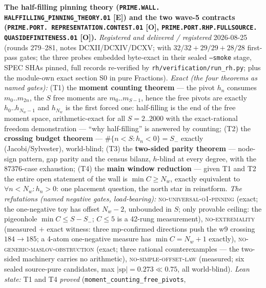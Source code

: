 \par\smallskip\noindent\textbf{The half-filling pinning theory
(\texttt{PRIME.WALL.\allowbreak
HALFFILLING\_PINNING\_THEORY.01} [E]) and the two wave-5
contracts (\texttt{PRIME.PORT.\allowbreak
REPRESENTATION.\allowbreak CONTEST.01} [O],
\texttt{PRIME.PORT.RHP.\allowbreak FULLSOURCE.\allowbreak
QUASIDEFINITENESS.01} [O]).}
{\sloppy
\emph{Registered and delivered / registered} 2026-08-25 (rounds
279--281, notes DCXII/DCXIV/DCXV;
 with $32/32 + 29/29
+ 28/28$ first-pass gates; the three probes embedded byte-exact
in their sealed \texttt{--smoke} stage, SPEC SHAs pinned, full
records re-verified by \texttt{rh/verification/run\_rh.py}; plus
the module-own exact section S0 in pure Fractions).  \emph{Exact
(the four theorems as named gates):} (T1) the \textbf{moment
counting theorem} --- the pivot $h_n$ consumes $m_0..m_{2n}$, the
$S$ free moments are $m_0..m_{S-1}$, hence the free pivots are
exactly $h_0..h_{N_w-1}$ and $h_{N_w}$ is the first forced one:
half-filling is the end of the free moment space, arithmetic-exact
for all $S = 2..2000$ with the exact-rational freedom
demonstration --- ``why half-filling'' is answered by counting;
(T2) the \textbf{crossing budget theorem} --- $\#\{n < S : h_n <
0\} = S_-$ exactly (Jacobi/Sylvester), world-blind; (T3) the
\textbf{two-sided parity theorem} --- node-sign pattern, gap
parity and the census bilanz, $h$-blind at every degree, with the
$87376$-case exhaustion; (T4) the \textbf{main window reduction}
--- given T1 and T2 the entire open statement of the wall is
$\min C \ge N_w$, exactly equivalent to $\forall n < N_w : h_n >
0$: one placement question, the north star in reinstform.
\emph{The refutations (named negative gates, load-bearing):}
\textsc{no-universal-o1-pinning} (exact; the one-negative toy has
offset $N_w - 2$, unbounded in $S$; only provable ceiling: the
pigeonhole $\min C \le S - S_-$; $C \le 5$ is a 42-rung
measurement), \textsc{no-extremality} (measured $+$ exact
witness: three mp-confirmed directions push the w9 crossing $184
\to 185$; a 4-atom one-negative measure has $\min C = N_w + 1$
exactly), \textsc{no-generic-maslov-obstruction} (exact; three
rational counterexamples --- the two-sided machinery carries no
arithmetic), \textsc{no-simple-offset-law} (measured; six sealed
source-pure candidates, max $|\mathrm{sp}| = 0.273 \ll 0.75$, all
world-blind).  \emph{Lean state:} T1 and T4 \emph{proved}
(\texttt{moment\_counting\_free\_pivots},
}
